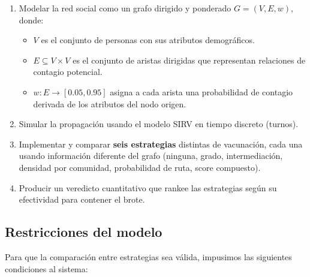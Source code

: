 \documentclass[spanish,notitlepage,letterpaper, 12pt]{article}
\begin{document}
\begin{enumerate}
    \item Modelar la red social como un grafo dirigido y ponderado $G = (V, E, w)$, donde:
    \begin{itemize}
        \item $V$ es el conjunto de personas con sus atributos demogr\'aficos.
        \item $E \subseteq V \times V$ es el conjunto de aristas dirigidas que representan relaciones de contagio potencial.
        \item $w: E \rightarrow [0.05, 0.95]$ asigna a cada arista una probabilidad de contagio derivada de los atributos del nodo origen.
    \end{itemize}
    \item Simular la propagaci\'on usando el modelo SIRV en tiempo discreto (turnos).
    \item Implementar y comparar \textbf{seis estrategias} distintas de vacunaci\'on, cada una usando informaci\'on diferente del grafo (ninguna, grado, intermediaci\'on, densidad por comunidad, probabilidad de ruta, score compuesto).
    \item Producir un veredicto cuantitativo que rankee las estrategias seg\'un su efectividad para contener el brote.
\end{enumerate}

\subsection{Restricciones del modelo}

Para que la comparaci\'on entre estrategias sea v\'alida, impusimos las siguientes condiciones al sistema:
\end{document}
